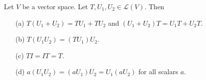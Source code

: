 \begin{theorem}\label{Properties of Compositions}
    Let \( V  \) be a vector space. Let \( T, {U}_{1}, {U}_{2} \in \mathcal{L}(V) \). Then 
    \begin{enumerate}
        \item[(a)] \( T({U}_{1} + {U}_{2}) = {TU}_{1} + {TU}_{2}  \) and \( ({U}_{1} + {U}_{2}) T = {U}_{1} T + {U}_{2} T  \).
        \item[(b)] \( T({U}_{1} {U}_{2}) = ({TU}_{1}){U}_{2} \).
        \item[(c)] \( TI = IT = T  \).
        \item[(d)] \( a({U}_{1}{U}_{2}) = ({aU}_{1}) {U}_{2} = {U}_{1} ({aU}_{2}) \) for all scalars \( a \). 
    \end{enumerate}
\end{theorem}
